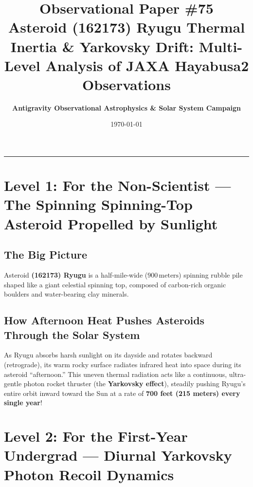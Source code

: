 \documentclass[11pt,a4paper]{article}
\title{\Huge \textbf{Observational Paper \#75}\\ \Large Asteroid (162173) Ryugu Thermal Inertia \& Yarkovsky Drift: Multi-Level Analysis of JAXA Hayabusa2 Observations}
\author{\textbf{Antigravity Observational Astrophysics \& Solar System Campaign}}
\date{\today}
\begin{document}
\maketitle

\vspace{-1em}
\begin{center}
\rule{\textwidth}{1.5pt}
\end{center}

\section*{Level 1: For the Non-Scientist — The Spinning Spinning-Top Asteroid Propelled by Sunlight}

\subsection*{The Big Picture}
Asteroid \textbf{(162173) Ryugu} is a half-mile-wide ($900\,\text{meters}$) spinning rubble pile shaped like a giant celestial spinning top, composed of carbon-rich organic boulders and water-bearing clay minerals.

\subsection*{How Afternoon Heat Pushes Asteroids Through the Solar System}
As Ryugu absorbs harsh sunlight on its dayside and rotates backward (retrograde), its warm rocky surface radiates infrared heat into space during its asteroid ``afternoon.'' This uneven thermal radiation acts like a continuous, ultra-gentle photon rocket thruster (the \textbf{Yarkovsky effect}), steadily pushing Ryugu's entire orbit inward toward the Sun at a rate of \textbf{700 feet (215 meters) every single year}!

\newpage

\section*{Level 2: For the First-Year Undergrad — Diurnal Yarkovsky Photon Recoil Dynamics}
\end{document}
